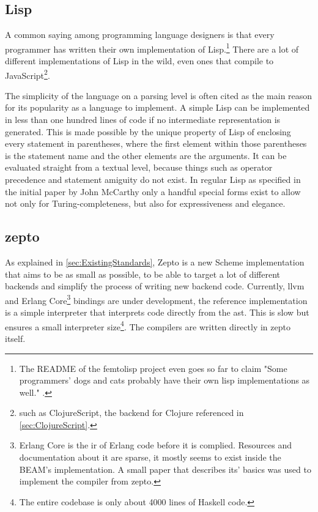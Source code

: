 \documentclass[oneside,11pt,xetex]{scrbook}
\begin{document}
\subsection{Lisp}

A common saying among programming language designers is that every programmer has written
their own implementation of Lisp.\footnote{The README of the femtolisp project even goes so
far to claim "Some programmers' dogs and cats probably have their own lisp implementations as well." \parencite{BEZL}.}
There are a lot of different implementations of Lisp
in the wild, even ones that compile to JavaScript\footnote{such as ClojureScript, the
backend for Clojure referenced in \ref{sec:ClojureScript}.}.

The simplicity of the language on a parsing level is often cited as the main reason for
its popularity as a language to implement.
A simple Lisp can be implemented in less than one hundred lines of code if no
intermediate representation is generated. This is made possible by the unique property
of Lisp of enclosing every statement in parentheses, where the first element within
those parentheses is the statement name and the other elements are the arguments.
It can be evaluated straight from a textual level, because things such as operator precedence
and statement amiguity do not exist. In regular Lisp as specified in the initial paper by
John McCarthy \parencite{JCM} only a handful special forms exist to allow not only for
Turing-completeness, but also for expressiveness and elegance.

\subsection{zepto}

As explained in \ref{sec:ExistingStandards}, Zepto is a new Scheme implementation that aims
to be as small as possible, to be able to target a lot of different backends and simplify the
process of writing new backend code. Currently, \gls{llvm} and Erlang Core\footnote{Erlang Core 
is the \gls{ir} of Erlang code before it is complied. Resources and documentation
about it are sparse, it mostly seems to exist inside the BEAM's implementation. A small
paper \parencite{ERL} that describes its' basics was used to implement the compiler from
zepto.} bindings are under development, the reference implementation is a simple interpreter
that interprets code directly from the \gls{ast}. This is slow but ensures a small
interpreter size\footnote{The entire codebase is only about 4000 lines of Haskell code.}.
The compilers are written directly in zepto itself.
\end{document}
